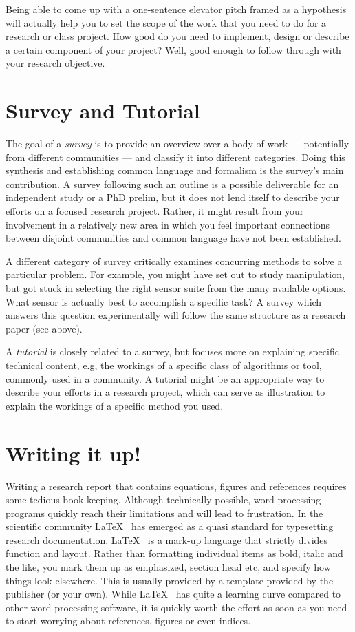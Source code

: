 \documentclass[paper=6.14in:9.21in,pagesize=pdftex,11pt,twoside,openright]{scrbook}
\begin{document}
Being able to come up with a one-sentence elevator pitch framed as a hypothesis will actually help you to set the scope of the work that you need to do for a research or class project. How good do you need to implement, design or describe a certain component of your project? Well, good enough to follow through with your research objective.

\section{Survey and Tutorial}
The goal of a \emph{survey} is to provide an overview over a body of work --- potentially from different communities --- and classify it into different categories. Doing this synthesis and establishing common language and formalism is the survey's main contribution.  A survey following such an outline is a possible deliverable for an independent study or a PhD prelim, but it does not lend itself to describe your efforts on a focused research project. Rather, it might result from your involvement in a relatively new area in which you feel important connections between disjoint communities and common language have not been established. 

A different category of survey critically examines concurring methods to solve a particular problem. For example, you might have set out to study manipulation, but got stuck in selecting the right sensor suite from the many available options. What sensor is actually best to accomplish a specific task? A survey which answers this question experimentally will follow the same structure as a research paper (see above).

A \emph{tutorial} is closely related to a survey, but focuses more on explaining specific technical content, e.g, the workings of a specific class of algorithms or tool, commonly used in a community. A tutorial might be an appropriate way to describe your efforts in a research project, which can serve as illustration to explain the workings of a specific method you used.

\section{Writing it up!}
Writing a research report that contains equations, figures and references requires some tedious book-keeping. Although technically possible, word processing programs quickly reach their limitations and will lead to frustration. In the scientific community \LaTeX~ has emerged as a quasi standard for typesetting research documentation. \LaTeX~ is a mark-up language that strictly divides function and layout. Rather than formatting individual items as bold, italic and the like, you mark them up as emphasized, section head etc, and specify how things look elsewhere. This is usually provided by a template provided by the publisher (or your own). While \LaTeX~ has quite a learning curve compared to other word processing software, it is quickly worth the effort as soon as you need to start worrying about references, figures or even indices. 
\end{document}
